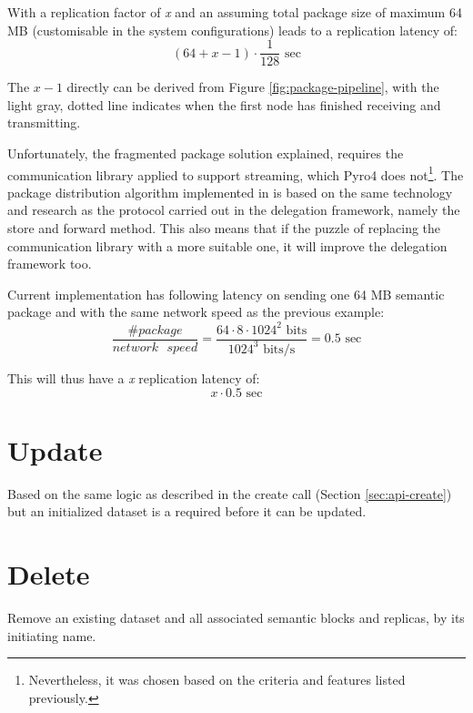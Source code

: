 With a replication factor of \textit{x} and an assuming total package size of maximum 64 MB (customisable in the system configurations) leads to a replication latency of:
\begin{equation}
	(64 + x - 1) \cdot \dfrac{1}{128} \text{ sec}
\end{equation}

The $x - 1$ directly can be derived from Figure \ref{fig:package-pipeline}, with the light gray, dotted line indicates when the first node has finished receiving and transmitting.
\newline

\noindent
Unfortunately, the fragmented package solution explained, requires the communication library applied to support streaming, which Pyro4 does not\footnote{Nevertheless, it was chosen based on the criteria and features listed previously.}. The package distribution algorithm implemented in \CodeName is based on the same technology and research as the protocol carried out in the delegation framework, namely the store and forward method. This also means that if the puzzle of replacing the communication library with a more suitable one, it will improve the delegation framework too.
\newline

Current implementation has following latency on sending one 64 MB semantic package and with the same network speed as the previous example:
\vspace*{1mm}
\begin{equation}
	\dfrac{\texttt{\#}package}{network\text{ }speed} = \dfrac{64\cdot 8\cdot 1024^2 \text{ bits}}{1024^3 \text{ bits/s}} = 0.5 \text{ sec}
\end{equation}
\vspace*{2mm}

\noindent
This will thus have a \textit{x} replication latency of:
\begin{equation}
	x \cdot 0.5 \text{ sec}
\end{equation}
 
\section{Update}
Based on the same logic as described in the create call (Section \ref{sec:api-create}) but an initialized dataset is a required before it can be updated.

\section{Delete}
Remove an existing dataset and all associated semantic blocks and replicas, by its 	initiating name.

